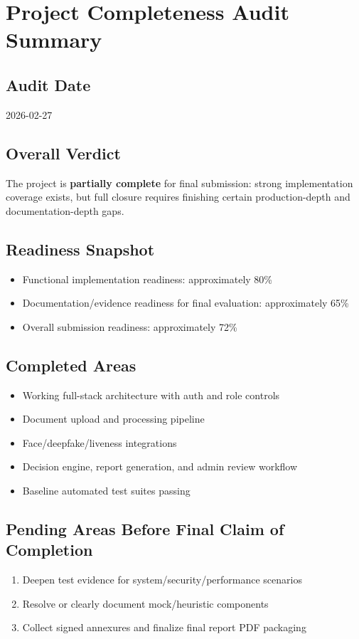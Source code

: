 \chapter{Project Completeness Audit Summary}
\label{app:completeness}

\section{Audit Date}
2026-02-27

\section{Overall Verdict}
The project is \textbf{partially complete} for final submission: strong implementation coverage exists, but full closure requires finishing certain production-depth and documentation-depth gaps.

\section{Readiness Snapshot}
\begin{itemize}
\item Functional implementation readiness: approximately 80\%
\item Documentation/evidence readiness for final evaluation: approximately 65\%
\item Overall submission readiness: approximately 72\%
\end{itemize}

\section{Completed Areas}
\begin{itemize}
\item Working full-stack architecture with auth and role controls
\item Document upload and processing pipeline
\item Face/deepfake/liveness integrations
\item Decision engine, report generation, and admin review workflow
\item Baseline automated test suites passing
\end{itemize}

\section{Pending Areas Before Final Claim of Completion}
\begin{enumerate}
\item Deepen test evidence for system/security/performance scenarios
\item Resolve or clearly document mock/heuristic components
\item Collect signed annexures and finalize final report PDF packaging
\end{enumerate}
